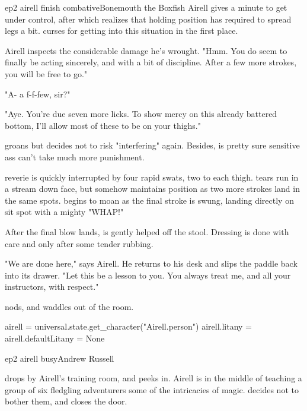\documentclass{book}
\begin{document}
\begin{childnode}{ep2 airell finish combative}{Bonemouth the Boxfish}
Airell gives \name{} a minute to get \himselfherself{} under control, after which \name{} realizes that holding \hisher{} position has required \himher{} to spread \hisher{} legs a bit. \HeShe{} 
curses \himselfherself{} for getting into this situation in the first place.

Airell inspects the considerable damage he's wrought. "Hmm. You do seem to finally be acting sincerely, and with a bit of discipline. After a few more strokes, you will be free to go."

"A- a f-f-few, sir?" 

"Aye. You're due seven more licks. To show mercy on this already battered bottom, I'll allow most of these to be on your thighs."

\name{} groans but decides not to risk "interfering" again. Besides, \heshe{} is pretty sure \hisher{} sensitive ass can't take much more punishment.

\HisHer{} reverie is quickly interrupted by four rapid swats, two to each thigh. \names{} tears run in a stream down \hisher{} face, but \heshe{} somehow maintains \hisher{} position as two more 
strokes land in the same spots. \HeShe{} begins to moan as the final stroke is swung, landing directly on \hisher{} sit spot with a mighty "WHAP!"

After the final blow lands, \name{} is gently helped off the stool. Dressing is done with care and only after some tender rubbing. 

"We are done here," says Airell. He returns to his desk and slips the paddle back into its drawer. "Let this be a lesson to you. You always treat me, and all your instructors, with respect."

\name{} nods, and waddles out of the room.


\begin{code}

    airell = universal.state.get_character("Airell.person")
    airell.litany = airell.defaultLitany = None

\end{code}

\end{childnode}

\begin{childnode}{ep2 airell busy}{Andrew Russell}

    \name{} drops by Airell's training room, and peeks in. Airell is in the middle of teaching a group of six fledgling adventurers some of the intricacies of magic. \name{} decides not to bother
    them, and closes the door.

\end{childnode}
\end{document}
